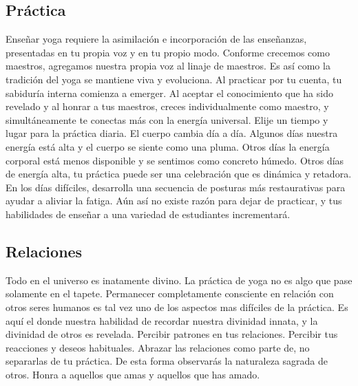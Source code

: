 \begin{itemize}
\subsection{Práctica}
Enseñar yoga requiere la asimilación e incorporación de las enseñanzas, presentadas en tu propia voz y en tu propio modo. Conforme crecemos como maestros, agregamos nuestra propia voz al linaje de maestros. Es así como la tradición del yoga se mantiene viva y evoluciona. Al practicar por tu cuenta, tu sabiduría interna comienza a emerger. Al aceptar el conocimiento que ha sido revelado y al honrar a tus maestros, creces individualmente como maestro, y simultáneamente te conectas más con la energía universal. Elije un tiempo y lugar para la práctica diaria. El cuerpo cambia día a día. Algunos días nuestra energía está alta y el cuerpo se siente como una pluma. Otros días la energía corporal está menos disponible y se sentimos como concreto húmedo. Otros días de energía alta, tu práctica puede ser una celebración que es dinámica y retadora. En los días difíciles, desarrolla una secuencia de posturas más restaurativas para ayudar a aliviar la fatiga. Aún así no existe razón para dejar de practicar, y tus habilidades de enseñar a una variedad de estudiantes incrementará.

\subsection{Relaciones}
Todo en el universo es inatamente divino. La práctica de yoga no es algo que pase solamente en el tapete. Permanecer completamente consciente en relación con otros seres humanos es tal vez uno de los aspectos mas difíciles de la práctica. Es aquí el donde nuestra habilidad de recordar nuestra divinidad innata, y la divinidad de otros es revelada. Percibir patrones en tus relaciones. Percibir tus reacciones y deseos habituales. Abrazar las relaciones como parte de, no separarlas de tu práctica. De esta forma observarás la naturaleza sagrada de otros. Honra a aquellos que amas y aquellos que has amado.


\end{itemize}
